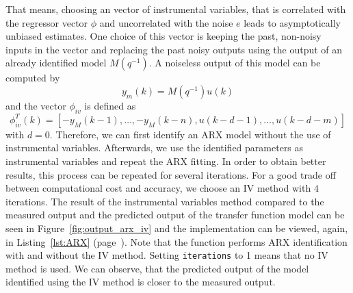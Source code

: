 That means, choosing an vector of instrumental variables, that is correlated with the regressor vector $\phi$ and uncorrelated with the noise $e$ leads to asymptotically unbiased estimates.
One choice of this vector is keeping the past, non-noisy inputs in the vector and replacing the past noisy outputs using the output of an already identified model $M(q^{-1})$. A noiseless output of this model can be computed by 
\begin{equation}
y_m(k) = M(q^{-1}) u(k)
\end{equation}
and the vector $\phi_{iv}$ is defined as
\begin{equation}
\phi_{iv}^T(k) = \left[-y_M(k-1),\ldots,-y_M(k-n),u(k-d-1),\ldots,u(k-d-m)\right]
\end{equation}
with $d=0$. 
Therefore, we can first identify an ARX model without the use of instrumental variables. 
Afterwards, we use the identified parameters as instrumental variables and repeat the ARX fitting.
In order to obtain better results, this process can be repeated for several iterations. 
For a good trade off between computational cost and accuracy, we choose an IV method with $4$ iterations. 
The result of the instrumental variables method compared to the measured output and the predicted output of the transfer function model can be seen in Figure~\ref{fig:output_arx_iv} and the implementation can be viewed, again, in Listing~\ref{lst:ARX} (page~\pageref{lst:ARX}).
Note that the function performs ARX identification with and without the IV method.
Setting \texttt{iterations} to 1 means that no IV method is used.
We can observe, that the predicted output of the model identified using the IV method is closer to the measured output.

